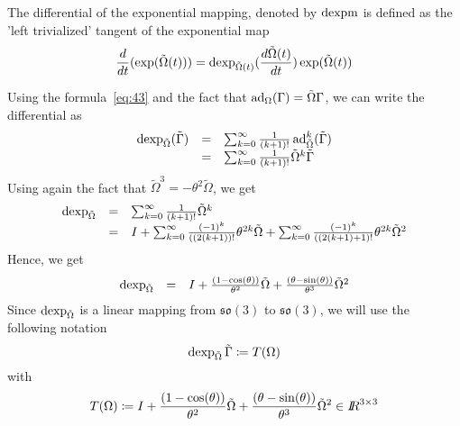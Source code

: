 
The differential of the exponential mapping, denoted by $\operatorname{dexpm}$ is defined as the 'left trivialized' tangent of the exponential map
\begin{equation}
  \label{eq:72}
   \frac{d}{dt} (\exp(\tilde \Omega(t))) = \operatorname{dexp}_{\tilde\Omega(t)}(\frac{d \tilde{\Omega}(t)}{dt}) \exp(\tilde\Omega(t))
\end{equation}

Using the formula~\eqref{eq:43} and the fact that $\operatorname{ad}_\Omega(\Gamma) = \Tilde\Omega \Gamma$, we can write the differential as
\begin{equation}
  \label{eq:122}
  \begin{array}{lcl}
    \operatorname{dexp}_{\tilde\Omega}(\tilde\Gamma) &=& \sum_{k=0}^\infty \frac{1}{(k+1)!} \operatorname{ad}_{\tilde \Omega}^k (\tilde\Gamma) \\
                                       &=& \sum_{k=0}^\infty \frac{1}{(k+1)!} \tilde\Omega^k \tilde \Gamma \\
  \end{array}
\end{equation}
Using again the fact that $\tilde\Omega^3 = -\theta^2 \tilde\Omega$, we get
\begin{equation}
  \label{eq:123}
   \begin{array}{lcl}
     \operatorname{dexp}_{\tilde\Omega} &=& \sum_{k=0}^\infty  \frac{1}{(k+1)!} \tilde\Omega^k \\
                          &=& I  + \sum_{k=0}^\infty  \frac{(-1)^k}{((2(k+1))!} \theta^{2k} \tilde\Omega + \sum_{k=0}^\infty  \frac{(-1)^k}{((2(k+1)+1)!} \theta^{2k} \tilde\Omega^2\\
  \end{array}
\end{equation}
Hence, we get
\begin{equation}
  \label{eq:124}
   \begin{array}{lcl}
     \operatorname{dexp}_{\tilde\Omega}  &=& I  + \frac{(1-\cos(\theta))}{\theta^2}\tilde\Omega + \frac{(\theta-\sin(\theta))}{\theta^3}\tilde\Omega^2 
  \end{array}
\end{equation}
Since $\operatorname{dexp}_{\tilde\Omega}$ is a linear mapping from $\mathfrak{so(3)}$ to $\mathfrak{so(3)}$, we will use the following notation
\begin{equation}
  \label{eq:172}
  \operatorname{dexp}_{\tilde\Omega}\tilde\Gamma  \coloneqq T(\Omega)
\end{equation}
with
\begin{equation}
  \label{eq:173}
   T(\Omega) \coloneqq I  + \frac{(1-\cos(\theta))}{\theta^2}\tilde\Omega + \frac{(\theta-\sin(\theta))}{\theta^3}\tilde\Omega^2  \in \mbox{\rm $I\!\!R$}^{3\times 3}
\end{equation}

